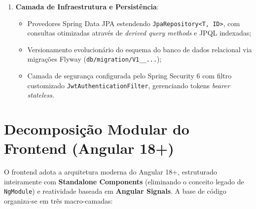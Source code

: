\begin{enumerate}
    \item \textbf{Camada de Infraestrutura e Persistência}:
    \begin{itemize}
        \item Provedores Spring Data JPA estendendo \texttt{JpaRepository<T, ID>}, com consultas otimizadas através de \textit{derived query methods} e JPQL indexadas;
        \item Versionamento evolucionário do esquema do banco de dados relacional via migrações Flyway (\texttt{db/migration/V1\_\_...});
        \item Camada de segurança configurada pelo Spring Security 6 com filtro customizado \texttt{JwtAuthenticationFilter}, gerenciando tokens \textit{bearer stateless}.
    \end{itemize}
\end{enumerate}

\section{Decomposição Modular do Frontend (Angular 18+)}
\label{sec_camadas_frontend}

O frontend adota a arquitetura moderna do Angular 18+, estruturado inteiramente com \textbf{Standalone Components} (eliminando o conceito legado de \texttt{NgModule}) e reatividade baseada em \textbf{Angular Signals}. A base de código organiza-se em três macro-camadas:

